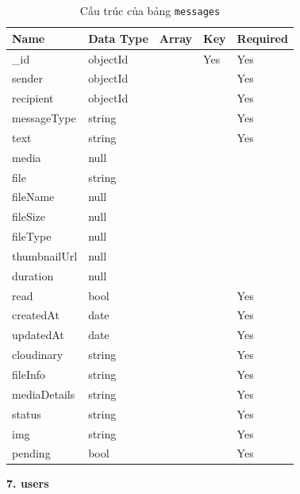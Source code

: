 \begin{table}[H]
\centering
\renewcommand{\arraystretch}{1.3}
\begin{tabular}{|p{4cm}|p{4cm}|p{2cm}|p{2cm}|p{2cm}|}
\hline
\textbf{Name} & \textbf{Data Type} & \textbf{Array} & \textbf{Key} & \textbf{Required} \\
\hline
\_id          & objectId &  & Yes & Yes \\
sender        & objectId &  &     & Yes \\
recipient     & objectId &  &     & Yes \\
messageType   & string   &  &     & Yes \\
text          & string   &  &     & Yes \\
media         & null     &  &     &     \\
file          & string   &  &     &     \\
fileName      & null     &  &     &     \\
fileSize      & null     &  &     &     \\
fileType      & null     &  &     &     \\
thumbnailUrl  & null     &  &     &     \\
duration      & null     &  &     &     \\
read          & bool     &  &     & Yes \\
createdAt     & date     &  &     & Yes \\
updatedAt     & date     &  &     & Yes \\
cloudinary    & string   &  &     & Yes \\
fileInfo      & string   &  &     & Yes \\
mediaDetails  & string   &  &     & Yes \\
status        & string   &  &     & Yes \\
img           & string   &  &     & Yes \\
pending       & bool     &  &     & Yes \\
\hline
\end{tabular}
\caption{Cấu trúc của bảng \texttt{messages}}
\end{table}
\newpage
\textbf{7. users}

